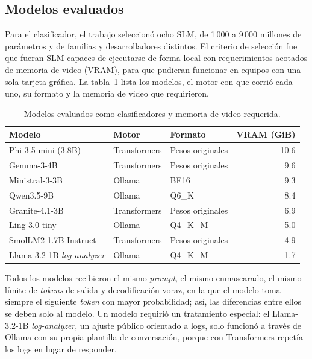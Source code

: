 \subsection{Modelos evaluados}\label{sec:met_slm}

Para el clasificador, el trabajo seleccionó ocho SLM, de 1\,000 a 9\,000 millones de parámetros y de familias y desarrolladores distintos. El criterio de selección fue que fueran SLM capaces de ejecutarse de forma local con requerimientos acotados de memoria de video (VRAM), para que pudieran funcionar en equipos con una sola tarjeta gráfica. La tabla~\ref{tab:met_modelos} lista los modelos, el motor con que corrió cada uno, su formato y la memoria de video que requirieron.

\begin{table}[H]
\centering
\caption{Modelos evaluados como clasificadores y memoria de video requerida.}
\label{tab:met_modelos}
\small
\begin{tabular}{@{}lllr@{}}
\toprule
\textbf{Modelo} & \textbf{Motor} & \textbf{Formato} & \textbf{VRAM (GiB)} \\
\midrule
Phi-3.5-mini (3.8B) & Transformers & Pesos originales & 10.6 \\
Gemma-3-4B & Transformers & Pesos originales & 9.6 \\
Ministral-3-3B & Ollama & BF16 & 9.3 \\
Qwen3.5-9B & Ollama & Q6\_K & 8.4 \\
Granite-4.1-3B & Transformers & Pesos originales & 6.9 \\
Ling-3.0-tiny & Ollama & Q4\_K\_M & 5.0 \\
SmolLM2-1.7B-Instruct & Transformers & Pesos originales & 4.9 \\
Llama-3.2-1B \textit{log-analyzer} & Ollama & Q4\_K\_M & 1.7 \\
\bottomrule
\end{tabular}
\normalsize
\end{table}

Todos los modelos recibieron el mismo \textit{prompt}, el mismo enmascarado, el mismo límite de \textit{tokens} de salida y decodificación voraz, en la que el modelo toma siempre el siguiente \textit{token} con mayor probabilidad; así, las diferencias entre ellos se deben solo al modelo. Un modelo requirió un tratamiento especial: el Llama-3.2-1B \textit{log-analyzer}, un ajuste público orientado a logs, solo funcionó a través de Ollama con su propia plantilla de conversación, porque con Transformers repetía los logs en lugar de responder.

